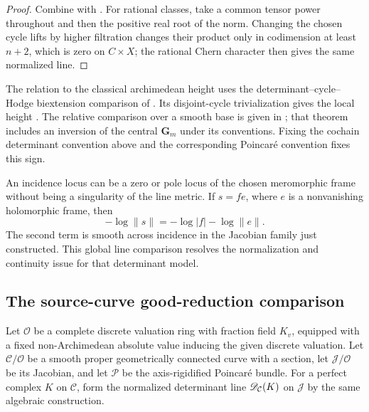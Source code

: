 
\begin{proof}
Combine  with
. For rational classes, take a common
tensor power throughout and then the positive real root of the
norm. Changing the chosen cycle lifts by higher filtration changes
their product only in codimension at least \(n+2\), which is
zero on \(C\times X\); the rational Chern character then gives
the same normalized line.
\end{proof}

The relation to the classical archimedean height uses the
determinant--cycle--Hodge biextension comparison of
\cite[Propositions~4.3, 4.29, 4.31 and Corollary~4.32]{Gorchinskiy}.
Its disjoint-cycle trivialization gives the local height
\cite[Remark~4.7]{Gorchinskiy}. The relative comparison over a
smooth base is given in \cite[Theorem~10.9]{Nakayama}; that theorem
includes an inversion of the central \(\mathbf G_m\) under its
conventions. Fixing the cochain determinant convention above and
the corresponding Poincaré convention fixes this sign.

An incidence locus can be a zero or pole locus of the chosen
meromorphic frame without being a singularity of the line metric.
If \(s=fe\), where \(e\) is a nonvanishing holomorphic frame, then
\[
 -\log\|s\|=-\log|f|-\log\|e\|.
\]
The second term is smooth across incidence in the Jacobian family
just constructed. This global line comparison resolves the
normalization and continuity issue for that determinant model.

\subsection{The source-curve good-reduction comparison}
\label{sec:good-reduction-metric}

Let \(\mathcal O\) be a complete discrete valuation ring with
fraction field \(K_v\), equipped with a fixed non-Archimedean
absolute value inducing the given discrete valuation.
Let \(\mathcal C/\mathcal O\) be a smooth proper geometrically
connected curve with a section, let \(\mathcal J/\mathcal O\)
be its Jacobian, and let \(\mathcal P\) be the axis-rigidified
Poincaré bundle. For a perfect complex \(K\) on \(\mathcal C\),
form the normalized determinant line \(\mathscr D_{\mathcal C}(K)\)
on \(\mathcal J\) by the same algebraic construction.

